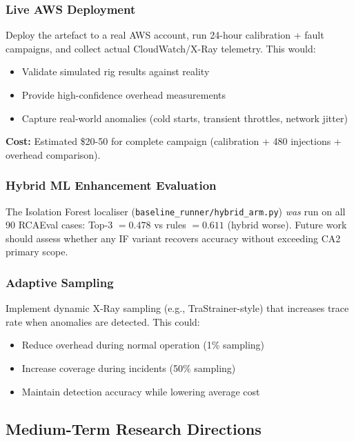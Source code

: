 \subsubsection{Live AWS Deployment}

Deploy the artefact to a real AWS account, run 24-hour calibration + fault campaigns, and collect actual CloudWatch/X-Ray telemetry. This would:
\begin{itemize}
    \item Validate simulated rig results against reality
    \item Provide high-confidence overhead measurements
    \item Capture real-world anomalies (cold starts, transient throttles, network jitter)
\end{itemize}

\textbf{Cost:} Estimated \$20-50 for complete campaign (calibration + 480 injections + overhead comparison).

\subsubsection{Hybrid ML Enhancement Evaluation}

The Isolation Forest localiser (\texttt{baseline\_runner/hybrid\_arm.py}) \emph{was} run on all 90 RCAEval cases: Top-3 $=0.478$ vs rules $=0.611$ (hybrid worse). Future work should assess whether any IF variant recovers accuracy without exceeding CA2 primary scope.

\subsubsection{Adaptive Sampling}

Implement dynamic X-Ray sampling (e.g., TraStrainer-style) that increases trace rate when anomalies are detected. This could:
\begin{itemize}
    \item Reduce overhead during normal operation (1\% sampling)
    \item Increase coverage during incidents (50\% sampling)
    \item Maintain detection accuracy while lowering average cost
\end{itemize}

\subsection{Medium-Term Research Directions}

